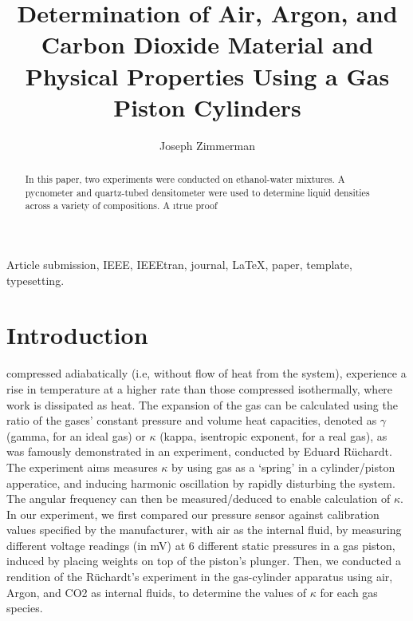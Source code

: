 \documentclass[lettersize,journal]{IEEEtran}
\begin{document}
	
	\title{Determination of Air, Argon, and Carbon Dioxide Material and Physical Properties Using a Gas Piston Cylinders}
	
	\author{Joseph Zimmerman}
	
	
	
	\maketitle
	
	\begin{abstract}
		In this paper, two experiments were conducted on ethanol-water mixtures. A pycnometer and quartz-tubed densitometer were used to determine liquid densities across a variety of compositions. A \i{true proof}
	\end{abstract}
	
	\begin{IEEEkeywords}
		Article submission, IEEE, IEEEtran, journal, \LaTeX, paper, template, typesetting.
	\end{IEEEkeywords}
	
	\section{Introduction}
	 compressed adiabatically (i.e, without flow of heat from the system), experience a rise in temperature at a higher rate than those compressed isothermally, where work is dissipated as heat. The expansion of the gas can be calculated using the ratio of the gases’ constant pressure and volume heat capacities, denoted as $\gamma$ (gamma, for an ideal gas) or $\kappa$ (kappa, isentropic exponent, for a real gas), as was famously demonstrated in an experiment, conducted by Eduard Rüchardt. The experiment aims measures $\kappa$ by using gas as a ‘spring’ in a cylinder/piston apperatice, and inducing harmonic oscillation by rapidly disturbing the system. The angular frequency can then be measured/deduced to enable calculation of $\kappa$. In our experiment, we first compared our pressure sensor against calibration values specified by the manufacturer, with air as the internal fluid, by measuring different voltage readings (in mV) at 6 different static pressures in a gas piston, induced by placing weights on top of the piston’s plunger. Then, we conducted a rendition of the Rüchardt’s experiment in the gas-cylinder apparatus using air, Argon, and CO2 as internal fluids, to determine the values of $\kappa$ for each gas species.
	
\end{document}
